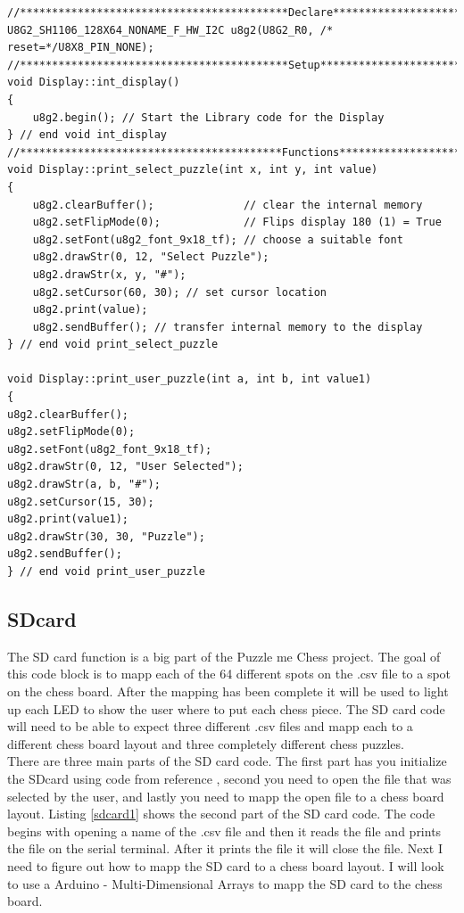 \documentclass[11pt]{article}
\begin{document}
\begin{lstlisting}[caption={Puzzle me Chess - display.cpp file},label={Display}]
//******************************************Declare*****************************//
U8G2_SH1106_128X64_NONAME_F_HW_I2C u8g2(U8G2_R0, /* reset=*/U8X8_PIN_NONE);
//******************************************Setup******************************//
void Display::int_display()
{
    u8g2.begin(); // Start the Library code for the Display
} // end void int_display
//*****************************************Functions**************************//
void Display::print_select_puzzle(int x, int y, int value)
{   
    u8g2.clearBuffer();              // clear the internal memory
    u8g2.setFlipMode(0);             // Flips display 180 (1) = True
    u8g2.setFont(u8g2_font_9x18_tf); // choose a suitable font
    u8g2.drawStr(0, 12, "Select Puzzle");
    u8g2.drawStr(x, y, "#");
    u8g2.setCursor(60, 30); // set cursor location
    u8g2.print(value);
    u8g2.sendBuffer(); // transfer internal memory to the display
} // end void print_select_puzzle

void Display::print_user_puzzle(int a, int b, int value1)
{
u8g2.clearBuffer();
u8g2.setFlipMode(0);
u8g2.setFont(u8g2_font_9x18_tf); 
u8g2.drawStr(0, 12, "User Selected");
u8g2.drawStr(a, b, "#");
u8g2.setCursor(15, 30); 
u8g2.print(value1);
u8g2.drawStr(30, 30, "Puzzle");
u8g2.sendBuffer();
} // end void print_user_puzzle
\end{lstlisting}

\subsection{SDcard}
The SD card function is a big part of the Puzzle me Chess project. The goal of this code block is to mapp each of the 64 different spots on the .csv file to a spot on the chess board. After the mapping has been complete it will be used to light up each LED to show the user where to put each chess piece. The SD card code will need to be able to expect three different .csv files and mapp each to a different chess board layout and three completely different chess puzzles. 
\\

\noindent There are three main parts of the SD card code. The first part has you initialize the SDcard using code from reference \cite{sdcard}, second you need to open the file that was selected by the user, and lastly you need to mapp the open file to a chess board layout. Listing \ref{sdcard1} shows the second part of the SD card code. The code begins with opening a name of the .csv file and then it reads the file and prints the file on the serial terminal. After it prints the file it will close the file. Next I need to figure out how to mapp the SD card to a chess board layout. I will look to use a Arduino - Multi-Dimensional Arrays to mapp the SD card to the chess board. 
\end{document}
